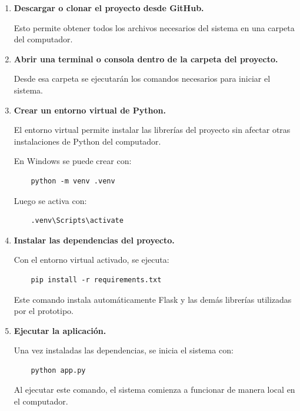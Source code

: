 \documentclass[11pt,letterpaper]{article}
\begin{document}
\begin{enumerate}

    \item \textbf{Descargar o clonar el proyecto desde GitHub.}

    Esto permite obtener todos los archivos necesarios del sistema en una carpeta del computador.

    \item \textbf{Abrir una terminal o consola dentro de la carpeta del proyecto.}

    Desde esa carpeta se ejecutarán los comandos necesarios para iniciar el sistema.

    \item \textbf{Crear un entorno virtual de Python.}

    El entorno virtual permite instalar las librerías del proyecto sin afectar otras instalaciones de Python del computador.

    En Windows se puede crear con:

    \begin{verbatim}
    python -m venv .venv
    \end{verbatim}

    Luego se activa con:

    \begin{verbatim}
    .venv\Scripts\activate
    \end{verbatim}

    \item \textbf{Instalar las dependencias del proyecto.}

    Con el entorno virtual activado, se ejecuta:

    \begin{verbatim}
    pip install -r requirements.txt
    \end{verbatim}

    Este comando instala automáticamente Flask y las demás librerías utilizadas por el prototipo.

    \item \textbf{Ejecutar la aplicación.}

    Una vez instaladas las dependencias, se inicia el sistema con:

    \begin{verbatim}
    python app.py
    \end{verbatim}

    Al ejecutar este comando, el sistema comienza a funcionar de manera local en el computador.


\end{enumerate}
\end{document}
